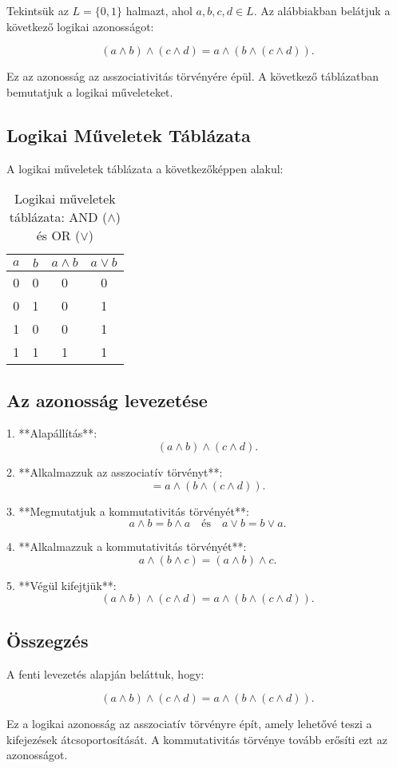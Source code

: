 \documentclass[a4paper,12pt]{article}
\begin{document}
Tekintsük az \( L = \{0, 1\} \) halmazt, ahol \( a, b, c, d \in L \). Az alábbiakban belátjuk a következő logikai azonosságot:

\[
(a \land b) \land (c \land d) = a \land (b \land (c \land d)).
\]

Ez az azonosság az asszociativitás törvényére épül. A következő táblázatban bemutatjuk a logikai műveleteket.

\subsection{Logikai Műveletek Táblázata}

A logikai műveletek táblázata a következőképpen alakul:

\begin{table}[h]
\centering
\begin{tabular}{|c|c|c|c|}
\hline
\( a \) & \( b \) & \( a \land b \) & \( a \lor b \) \\ \hline
0 & 0 & 0 & 0 \\ \hline
0 & 1 & 0 & 1 \\ \hline
1 & 0 & 0 & 1 \\ \hline
1 & 1 & 1 & 1 \\ \hline
\end{tabular}
\caption{Logikai műveletek táblázata: AND (\(\land\)) és OR (\(\lor\))}
\end{table}

\subsection{Az azonosság levezetése}

1. **Alapállítás**:
   \[
   (a \land b) \land (c \land d).
   \]

2. **Alkalmazzuk az asszociatív törvényt**:
   \[
   = a \land (b \land (c \land d)).
   \]

3. **Megmutatjuk a kommutativitás törvényét**:
   \[
   a \land b = b \land a \quad \text{és} \quad a \lor b = b \lor a.
   \]

4. **Alkalmazzuk a kommutativitás törvényét**:
   \[
   a \land (b \land c) = (a \land b) \land c.
   \]

5. **Végül kifejtjük**:
   \[
   (a \land b) \land (c \land d) = a \land (b \land (c \land d)).
   \]

\subsection{Összegzés}

A fenti levezetés alapján beláttuk, hogy:

\[
(a \land b) \land (c \land d) = a \land (b \land (c \land d)).
\]

Ez a logikai azonosság az asszociatív törvényre épít, amely lehetővé teszi a kifejezések átcsoportosítását. A kommutativitás törvénye tovább erősíti ezt az azonosságot.
\end{document}
